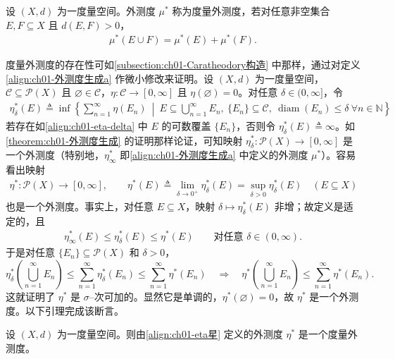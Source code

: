 \documentclass[../../main.tex]{subfiles}%
\begin{document}
\begin{definition}\label{definition:ch01-度量外测度}
设 $(X,d)$ 为一度量空间。外测度 $\mu^*$ 称为度量外测度，若对任意非空集合 $E,F\subseteq X$ 且 $d(E,F)>0$，
\begin{align}
\mu^*(E\cup F)=\mu^*(E)+\mu^*(F). \label{align:ch01-度量外测度条件}
\end{align}
\end{definition}

度量外测度的存在性可如\cref{subsection:ch01-Caratheodory构造} 中那样，通过对定义\eqref{align:ch01-外测度生成a} 作微小修改来证明。设 $(X,d)$ 为一度量空间，$\mathcal{C}\subseteq\mathcal{P}(X)$ 且 $\varnothing \in\mathcal{C}$，$\eta:\mathcal{C}\to[0,\infty]$ 且 $\eta(\varnothing )=0$。对任意 $\delta\in(0,\infty]$，令
\begin{align}
\eta_\delta^*(E)\triangleq \inf\left\{\sum_{n=1}^\infty\eta(E_n)\ \middle|\ E\subseteq\bigcup_{n=1}^\infty E_n,\ \{E_n\}\subseteq\mathcal{C},\ \operatorname{diam}(E_n)\leqslant\delta\ \forall n\in\mathbb{N}\right\} \label{align:ch01-eta-delta}
\end{align}
若存在如\eqref{align:ch01-eta-delta} 中 $E$ 的可数覆盖 $\{E_n\}$，否则令 $\eta_\delta^*(E)\triangleq \infty$。如\cref{theorem:ch01-外测度生成} 的证明那样论证，可知映射 $\eta_\delta^*:\mathcal{P}(X)\to[0,\infty]$ 是一个外测度（特别地，$\eta_\infty^*$ 即\eqref{align:ch01-外测度生成a} 中定义的外测度 $\mu^*$）。容易看出映射
\begin{align}
\eta^*:\mathcal{P}(X)\to[0,\infty],\qquad
\eta^*(E)\triangleq \lim_{\delta\to0^+}\eta_\delta^*(E)=\sup_{\delta>0}\eta_\delta^*(E)\quad(E\subseteq X) \label{align:ch01-eta星}
\end{align}
也是一个外测度。事实上，对任意 $E\subseteq X$，映射 $\delta\mapsto\eta_\delta^*(E)$ 非增；故定义是适定的，且
\begin{align}
\eta_\infty^*(E)\leqslant\eta_\delta^*(E)\leqslant\eta^*(E)\qquad\text{对任意 }\delta\in(0,\infty). \label{align:ch01-eta不等式}
\end{align}
于是对任意 $\{E_n\}\subseteq\mathcal{P}(X)$ 和 $\delta>0$，
\[
\eta_\delta^*\left(\bigcup_{n=1}^\infty E_n\right)\leqslant\sum_{n=1}^\infty\eta_\delta^*(E_n)\leqslant\sum_{n=1}^\infty\eta^*(E_n)
\quad\Rightarrow\quad
\eta^*\left(\bigcup_{n=1}^\infty E_n\right)\leqslant\sum_{n=1}^\infty\eta^*(E_n).
\]
这就证明了 $\eta^*$ 是 $\sigma$--次可加的。显然它是单调的，$\eta^*(\varnothing )=0$，故 $\eta^*$ 是一个外测度。以下引理完成该断言。

\begin{lemma}\label{lemma:ch01-eta星是度量外测度}
设 $(X,d)$ 为一度量空间。则由\eqref{align:ch01-eta星} 定义的外测度 $\eta^*$ 是一个度量外测度。
\end{lemma}
\end{document}

